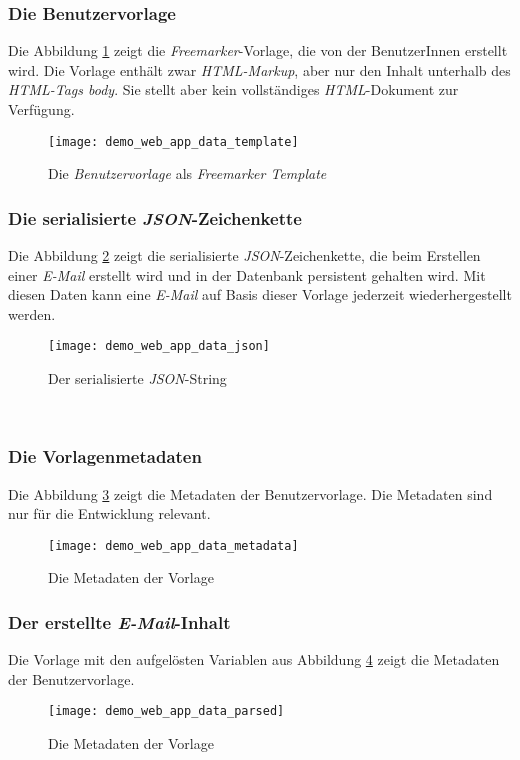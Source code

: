 \subsubsection{Die Benutzervorlage}
Die Abbildung \ref{fig:demo_web_app_data_template} zeigt die \emph{Freemarker}-Vorlage, die von der BenutzerInnen erstellt wird. Die Vorlage enthält zwar \emph{HTML-Markup}, aber nur den Inhalt unterhalb des \emph{HTML-Tags body}. Sie stellt aber kein vollständiges \emph{HTML}-Dokument zur Verfügung.
\begin{figure}[h]
\centering
\texttt{[image: demo\_web\_app\_data\_template]}
\caption{Die \emph{Benutzervorlage} als \emph{Freemarker Template}}
\label{fig:demo_web_app_data_template}
\end{figure}

\subsubsection{Die serialisierte \emph{JSON}-Zeichenkette}
Die Abbildung \ref{fig:demo_web_app_data_json} zeigt die serialisierte \emph{JSON}-Zeichenkette, die beim Erstellen einer \emph{E-Mail} erstellt wird und in der Datenbank persistent gehalten wird. Mit diesen Daten kann eine \emph{E-Mail} auf Basis dieser Vorlage jederzeit wiederhergestellt werden.
\begin{figure}[h]
\centering
\texttt{[image: demo\_web\_app\_data\_json]}
\caption{Der serialisierte \emph{JSON}-String}
\label{fig:demo_web_app_data_json}
\end{figure}
\ \newpage

\subsubsection{Die Vorlagenmetadaten}
Die Abbildung \ref{fig:demo_web_app_data_metadata} zeigt die Metadaten der Benutzervorlage. Die Metadaten sind nur für die Entwicklung relevant.
\begin{figure}[h]
\centering
\texttt{[image: demo\_web\_app\_data\_metadata]}
\caption{Die Metadaten der Vorlage}
\label{fig:demo_web_app_data_metadata}
\end{figure}

\subsubsection{Der erstellte \emph{E-Mail}-Inhalt}
Die Vorlage mit den aufgelösten Variablen aus Abbildung \ref{fig:demo_web_app_data_parsed} zeigt die Metadaten der Benutzervorlage. 
\begin{figure}[h]
\centering
\texttt{[image: demo\_web\_app\_data\_parsed]}
\caption{Die Metadaten der Vorlage}
\label{fig:demo_web_app_data_parsed}
\end{figure}